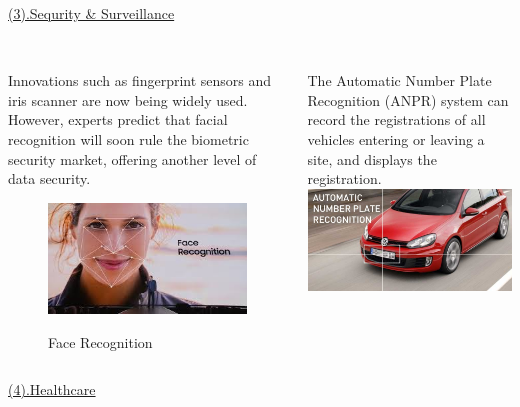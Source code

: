 \documentclass{beamer}
\begin{document}
{{\begin{frame}[t]{\underline{(3).Sequrity \& Surveillance}}
\begin{exampleblock}
\end{exampleblock}
\begin{columns}[t]
\pause
\begin{column}[t]{5cm}
\\
\small{Innovations such as fingerprint sensors and iris scanner are now being widely used. However, experts predict that facial recognition will soon rule the biometric security market, offering another level of data security.}\\
\begin{figure}[t]
\href{run:Face.mp4}{\includegraphics[scale=.4]{Face.jpg}}
  \caption{Face Recognition}\label{Face Recognition}
\end{figure}

\end{column}
\pause
\begin{column}{5cm}
\\
\small{The Automatic Number Plate Recognition (ANPR) system can record the registrations of all vehicles entering or leaving a site, and displays the registration.%
\\}
\href{run:ANPR.mp4}{\includegraphics[scale=.2]{ANPR.jpg}}
\end{column}
\end{columns}
\end{frame}
}
{
\begin{frame}[t]{\underline{(4).Healthcare}}
\begin{block}
	

\end{block}
\end{frame}}}
\end{document}
